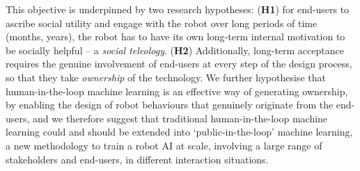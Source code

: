 \documentclass[11pt,a4paper]{report}
\begin{document}
This objective is underpinned by two research hypotheses: (\textbf{H1}) for
end-users to ascribe social utility and engage with the robot over long periods
of time (months, years), the robot has to have its own long-term internal
motivation to be socially helpful -- a \emph{social teleology}. (\textbf{H2})
Additionally, long-term acceptance requires the genuine involvement of end-users
at every step of the design process, so that they take \emph{ownership} of the
technology. We further hypothesise that human-in-the-loop machine learning is an
effective way of generating ownership, by enabling the design of robot
behaviours that genuinely originate from the end-users, and we therefore suggest
that traditional human-in-the-loop machine learning could and should be extended
into `public-in-the-loop' machine learning, a new methodology to train a robot
AI at scale, involving a large range of stakeholders and end-users, in different
interaction situations.
\end{document}
